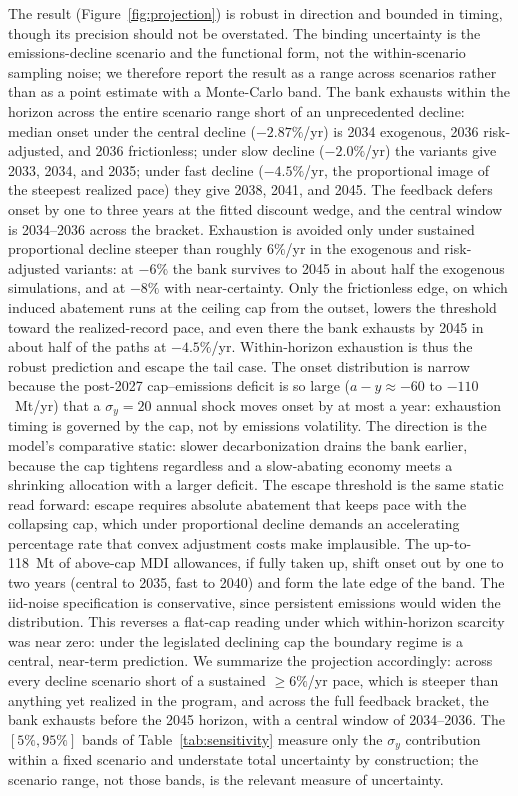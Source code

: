 \documentclass[11pt,letterpaper]{article}
\theoremstyle{plain}
\theoremstyle{definition}
\numberwithin{equation}{section}
\begin{document}
The result (Figure~\ref{fig:projection}) is robust in direction and bounded in timing, though its precision should not be overstated. The binding uncertainty is the emissions-decline scenario and the functional form, not the within-scenario sampling noise; we therefore report the result as a range across scenarios rather than as a point estimate with a Monte-Carlo band. The bank exhausts within the horizon across the entire scenario range short of an unprecedented decline: median onset under the central decline ($-2.87\%$/yr) is 2034 exogenous, 2036 risk-adjusted, and 2036 frictionless; under slow decline ($-2.0\%$/yr) the variants give 2033, 2034, and 2035; under fast decline ($-4.5\%$/yr, the proportional image of the steepest realized pace) they give 2038, 2041, and 2045. The feedback defers onset by one to three years at the fitted discount wedge, and the central window is 2034--2036 across the bracket. Exhaustion is avoided only under sustained proportional decline steeper than roughly $6\%$/yr in the exogenous and risk-adjusted variants: at $-6\%$ the bank survives to 2045 in about half the exogenous simulations, and at $-8\%$ with near-certainty. Only the frictionless edge, on which induced abatement runs at the ceiling cap from the outset, lowers the threshold toward the realized-record pace, and even there the bank exhausts by 2045 in about half of the paths at $-4.5\%$/yr. Within-horizon exhaustion is thus the robust prediction and escape the tail case. The onset distribution is narrow because the post-2027 cap--emissions deficit is so large ($a-y\approx-60$ to $-110$~Mt/yr) that a $\sigma_y=20$ annual shock moves onset by at most a year: exhaustion timing is governed by the cap, not by emissions volatility. The direction is the model's comparative static: slower decarbonization drains the bank earlier, because the cap tightens regardless and a slow-abating economy meets a shrinking allocation with a larger deficit. The escape threshold is the same static read forward: escape requires absolute abatement that keeps pace with the collapsing cap, which under proportional decline demands an accelerating percentage rate that convex adjustment costs make implausible. The up-to-118~Mt of above-cap MDI allowances, if fully taken up, shift onset out by one to two years (central to 2035, fast to 2040) and form the late edge of the band. The iid-noise specification is conservative, since persistent emissions would widen the distribution. This reverses a flat-cap reading under which within-horizon scarcity was near zero: under the legislated declining cap the boundary regime is a central, near-term prediction. We summarize the projection accordingly: across every decline scenario short of a sustained $\geq6\%$/yr pace, which is steeper than anything yet realized in the program, and across the full feedback bracket, the bank exhausts before the 2045 horizon, with a central window of 2034--2036. The $[5\%,95\%]$ bands of Table~\ref{tab:sensitivity} measure only the $\sigma_y$ contribution within a fixed scenario and understate total uncertainty by construction; the scenario range, not those bands, is the relevant measure of uncertainty.
\end{document}
